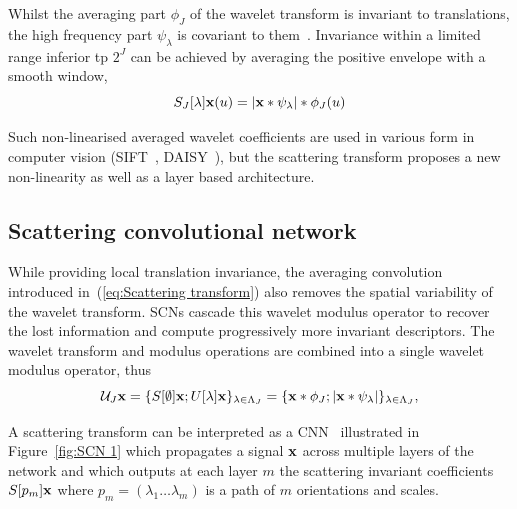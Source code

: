 \documentclass{article}
\begin{document}
    Whilst the averaging part $\phi_{J}$ of the wavelet transform is invariant to translations, the high frequency part $\psi_{\lambda}$ is covariant to them~\cite{mallat2012gis}. Invariance within a
    limited range inferior tp $2^{J}$ can be achieved by averaging the positive envelope with a smooth window,
    \vspace{-5pt}
    \begin{equation}
      \label{eq:Scattering transform}
      S_{J}[\lambda]{\bf x}(u) = \left| {\bf x} \ast \psi_{\lambda} \right| \ast \phi_{J}(u)
    \end{equation}
    \vspace{-10pt}
    
    Such non-linearised averaged wavelet coefficients are used in various form in computer vision (SIFT~\cite{grabner2006fast}, DAISY~\cite{winder2009picking}), but the scattering transform proposes a new non-linearity as well as a layer based architecture.
  
  \vspace{-5pt}
  \subsection{Scattering convolutional network}
    \label{subsec:SCN/SCN}
    \vspace{-5pt}
    While providing local translation invariance, the averaging convolution introduced in~(\ref{eq:Scattering transform}) also removes the spatial variability of the wavelet transform. SCNs
    cascade this wavelet modulus operator to recover the lost information and compute progressively more invariant descriptors. The wavelet transform and modulus operations are combined into a single wavelet modulus operator, thus
    \vspace{-5pt}
    \begin{equation}
      \mathcal{U}_{J} {\bf x} = \{ S[\emptyset] {\bf x} ; U[\lambda]{\bf x} \}_{\lambda \in \Lambda_{J}} 
          = \{ {\bf x} \ast \phi_{J}; \left| {\bf x} \ast \psi_{\lambda} \right| \}_{\lambda \in \Lambda_{J}},
      \label{eq:One step propagator}
    \end{equation}
    
    A scattering transform can be interpreted as a CNN~\cite{oyallon2014deep} illustrated in Figure~\ref{fig:SCN 1} which propagates a signal ${\bf x}$ across multiple layers of the network and which outputs at each layer $m$ the scattering invariant coefficients $S[p_{m}]{\bf x}$ where $p_{m}=(\lambda_{1} \dots \lambda_{m})$ is a path of $m$ orientations and scales.
    
\end{document}
